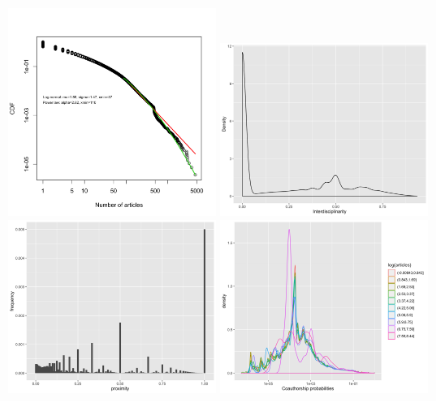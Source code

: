 \documentclass[utf8,11pt]{article}
\begin{document}


\begin{figure}
\includegraphics[width=0.49\textwidth]{articlenum_fitDistrPowerLaw.png}
\includegraphics[width=0.49\textwidth]{interdisciplinarity.png}\\
\includegraphics[width=0.49\textwidth]{proximity.png}
\includegraphics[width=0.49\textwidth]{collabprobas_byarticclenum.png}

\end{figure}
\end{document}

